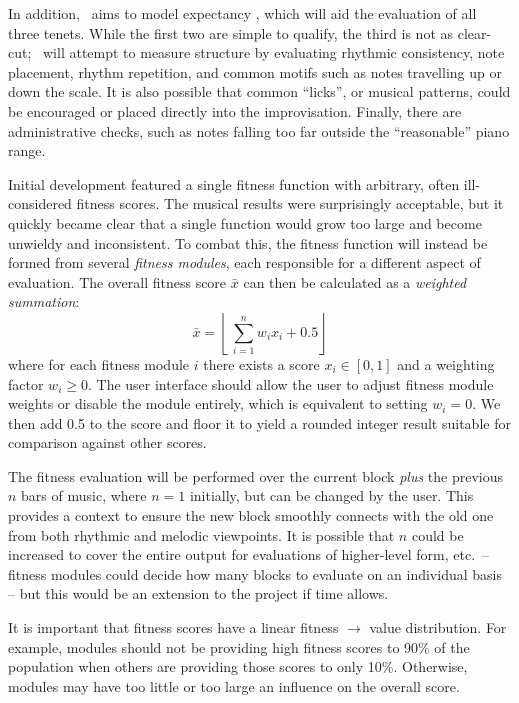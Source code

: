 In addition, \jg\ aims to model expectancy \citep{narmour90,narmour92}, which will aid the evaluation of all three tenets. While the first two are simple to qualify, the third is not as clear-cut; \jg\ will attempt to measure structure by evaluating rhythmic consistency, note placement, rhythm repetition, and common motifs such as notes travelling up or down the scale. It is also possible that common ``licks'', or musical patterns, could be encouraged or placed directly into the improvisation. Finally, there are administrative checks, such as notes falling too far outside the ``reasonable'' piano range.

Initial development featured a single fitness function with arbitrary, often ill-considered fitness scores. The musical results were surprisingly acceptable, but it quickly became clear that a single function would grow too large and become unwieldy and inconsistent. To combat this, the fitness function will instead be formed from several \emph{fitness modules}, each responsible for a different aspect of evaluation. The overall fitness score $\bar{x}$ can then be calculated as a \emph{weighted summation}: \[ \bar{x} = \left\lfloor\, \sum_{i=1}^n w_i x_i + 0.5 \right\rfloor \] where for each fitness module $i$ there exists a score $x_i \in [0,1]$ and a weighting factor $w_i \geq 0$. The user interface should allow the user to adjust fitness module weights or disable the module entirely, which is equivalent to setting $w_i = 0$. We then add 0.5 to the score and floor it to yield a rounded integer result suitable for comparison against other scores.

The fitness evaluation will be performed over the current block \emph{plus} the previous $n$ bars of music, where $n = 1$ initially, but can be changed by the user. This provides a context to ensure the new block smoothly connects with the old one from both rhythmic and melodic viewpoints. It is possible that $n$ could be increased to cover the entire output for evaluations of higher-level form, etc.\ -- fitness modules could decide how many blocks to evaluate on an individual basis -- but this would be an extension to the project if time allows.

It is important that fitness scores have a linear fitness $\to$ value distribution. For example, modules should not be providing high fitness scores to 90\% of the population when others are providing those scores to only 10\%. Otherwise, modules may have too little or too large an influence on the overall score.

